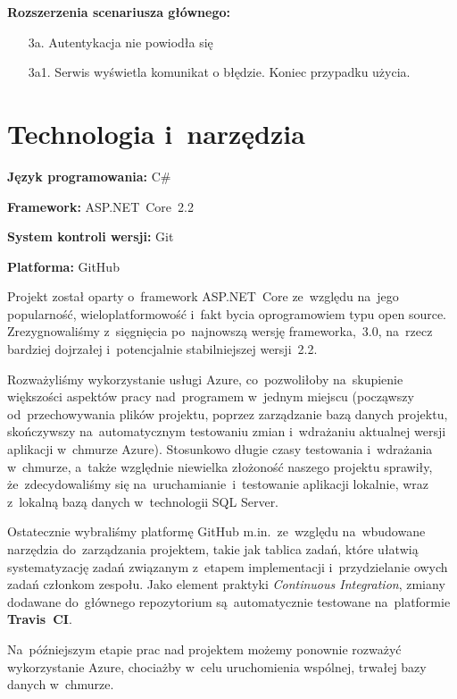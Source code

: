 \documentclass{article}
\begin{document}
\textbf{Rozszerzenia scenariusza głównego:}
\begin{itemize}
	\item[3a.] Autentykacja nie powiodła się
	\item[3a1.] Serwis wyświetla komunikat o błędzie. Koniec przypadku użycia.
\end{itemize}

\newpage
\section{Technologia i~narzędzia}

\textbf{Język programowania:} C\#

\textbf{Framework:} ASP.NET~Core~2.2

\textbf{System kontroli wersji:} Git

\textbf{Platforma:} GitHub

Projekt został oparty o~framework ASP.NET~Core ze~względu na~jego popularność, wieloplatformowość i~fakt bycia oprogramowiem typu open source. Zrezygnowaliśmy z~sięgnięcia po~najnowszą wersję frameworka,~3.0, na~rzecz bardziej dojrzałej i~potencjalnie stabilniejszej wersji~2.2.

Rozważyliśmy wykorzystanie usługi Azure, co~pozwoliłoby na~skupienie większości aspektów pracy nad~programem w~jednym miejscu (począwszy od~przechowywania plików projektu, poprzez zarządzanie bazą danych projektu, skończywszy na~automatycznym testowaniu zmian i~wdrażaniu aktualnej wersji aplikacji w~chmurze Azure). Stosunkowo długie czasy testowania i~wdrażania w~chmurze, a~także względnie niewielka złożoność naszego projektu sprawiły, że~zdecydowaliśmy się na~uruchamianie~i~testowanie aplikacji lokalnie, wraz z~lokalną bazą danych w~technologii SQL Server.

Ostatecznie wybraliśmy platformę GitHub m.in.~ze~względu na~wbudowane narzędzia do~zarządzania projektem, takie jak tablica zadań, które ułatwią systematyzację zadań związanym z~etapem implementacji i~przydzielanie owych zadań członkom zespołu. Jako element praktyki \emph{Continuous Integration}, zmiany dodawane do~głównego repozytorium są~automatycznie testowane na~platformie \textbf{Travis~CI}.

Na~późniejszym etapie prac nad projektem możemy ponownie rozważyć wykorzystanie Azure, chociażby w~celu uruchomienia wspólnej, trwałej bazy danych w~chmurze.

\end{document}
